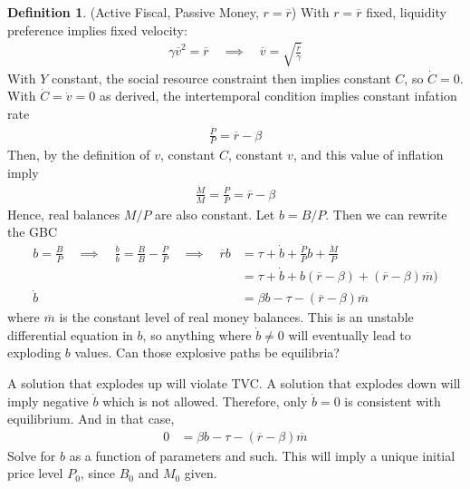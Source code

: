 \documentclass[12pt]{article}
\theoremstyle{plain}
\theoremstyle{definition}
\newtheorem{defn}[thm]{Definition}
\theoremstyle{remark}
\begin{document}
\begin{defn}(Active Fiscal, Passive Money, $r=\overline{r}$)
With $r=\overline{r}$ fixed, liquidity preference implies
fixed velocity:
\begin{align*}
  \gamma \overline{v}^2
  = \overline{r}
  \quad\implies\quad
  \overline{v}
  = \sqrt{\frac{\overline{r}}{\gamma}}
\end{align*}
With $Y$ constant, the social resource constraint then implies constant
$C$, so $\dot{C}=0$.
With $\dot{C}=\dot{v}=0$ as derived, the intertemporal condition implies
constant infation rate
\begin{align*}
  \frac{\dot{P}}{P}
  = \overline{r}-\beta
\end{align*}
Then, by the definition of $v$, constant $C$, constant $v$, and this
value of inflation imply
\begin{align*}
  \frac{\dot{M}}{M}
  =
  \frac{\dot{P}}{P}
  = \overline{r}-\beta
\end{align*}
Hence, real balances $M/P$ are also constant.
Let $b=B/P$. Then we can rewrite the GBC
\begin{align*}
  b=
  \frac{B}{P}
  \quad\implies\quad
  \frac{\dot{b}}{b}
  =
  \frac{\dot{B}}{B}
  - \frac{\dot{P}}{P}
  \quad\implies\quad
  \overline{r}b
  &=
  \tau
  +
  \dot{b}
  +
  \frac{\dot{P}}{P}
  b
  + \frac{\dot{M}}{P}
  \\
  &=
  \tau
  +
  \dot{b}
  +
  b
  (\overline{r}-\beta)
  + (\overline{r}-\beta)
    \overline{m})
  \\
  \dot{b}
  &=
  \beta b
  - \tau
  - (\overline{r}-\beta)\overline{m}
\end{align*}
where $\overline{m}$ is the constant level of real money balances.
This is an unstable differential equation in $b$, so anything where
$\dot{b}\neq 0$ will eventually lead to exploding $b$ values.
Can those explosive paths be equilibria?

A solution that explodes up will violate TVC.
A solution that explodes down will imply negative $\dot{b}$ which is not
allowed.
Therefore, only $\dot{b}=0$ is consistent with equilibrium.
And in that case,
\begin{align*}
  0
  &=
  \beta b
  - \tau
  - (\overline{r}-\beta)\overline{m}
\end{align*}
Solve for $b$ as a function of parameters and such.
This will imply a unique initial price level $P_0$, since $B_0$ and
$M_0$ given.
\end{defn}
\end{document}
